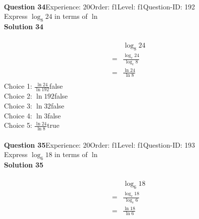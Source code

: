 \documentclass{article}
\begin{document}
\\[4pt]
\noindent\textbf{Question 34}\hspace{20pt}Experience: 20\hspace{20pt}Order: f1\hspace{20pt}Level: f1\hspace{20pt}Question-ID: 192\\[2pt]
Express $\log_{8}24$ in terms of $\ln$\\[4pt]
\noindent\textbf{Solution 34}\\[2pt]
\\[-35pt]\begin{align*}
&\log_{8}24\\[2pt]
=&\displaystyle\frac{\log_{e}24}{\log_{e}8}\\[2pt]
=&\displaystyle\frac{\ln24}{\ln8}\\[-100pt]
\end{align*}
Choice 1: \hspace{20pt}$\displaystyle\frac{\ln24}{\ln192}$\hspace{20pt}false\\
Choice 2: \hspace{20pt}$\ln{192}$\hspace{20pt}false\\
Choice 3: \hspace{20pt}$\ln{32}$\hspace{20pt}false\\
Choice 4: \hspace{20pt}$\ln{3}$\hspace{20pt}false\\
Choice 5: \hspace{20pt}$\displaystyle\frac{\ln24}{\ln8}$\hspace{20pt}true\\
\\[4pt]
\noindent\textbf{Question 35}\hspace{20pt}Experience: 20\hspace{20pt}Order: f1\hspace{20pt}Level: f1\hspace{20pt}Question-ID: 193\\[2pt]
Express $\log_{6}18$ in terms of $\ln$\\[4pt]
\noindent\textbf{Solution 35}\\[2pt]
\\[-35pt]\begin{align*}
&\log_{6}18\\[2pt]
=&\displaystyle\frac{\log_{e}18}{\log_{e}6}\\[2pt]
=&\displaystyle\frac{\ln18}{\ln6}\\[-100pt]
\end{align*}
\end{document}
